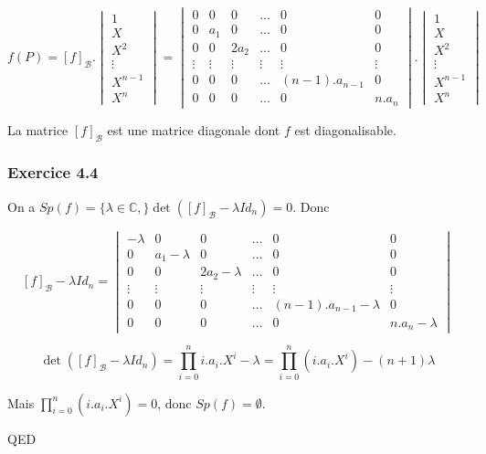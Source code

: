\documentclass[]{book}
\theoremstyle{definition}
\newcommand{\bb}[1]{\mathbb{#1}}
\newcommand{\C}{\bb{C}}
\begin{document}
$$f(P) = [f]_{\mathscr{B}}. \begin{vmatrix} 1 \\ X \\ X^2 \\ \vdots \\ X^{n-1} \\ X^{n} \end{vmatrix} = \begin{vmatrix} 0 & 0 & 0 & \ldots & 0 & 0 \\ 0 & a_1 & 0 & \ldots & 0 & 0 \\ 0 & 0 & 2a_2 & \ldots & 0 & 0 \\ \vdots & \vdots & \vdots & \vdots & \vdots & \vdots \\ 0 & 0 & 0 & \ldots & (n-1).a_{n-1} & 0\\ 0 & 0 & 0 & \ldots & 0 & n.a_n  \end{vmatrix}.\begin{vmatrix} 1 \\ X \\ X^2 \\ \vdots \\ X^{n-1} \\ X^{n} \end{vmatrix}$$

La matrice $[f]_{\mathscr{B}}$ est une matrice diagonale dont $f$ est diagonalisable.

\subsubsection*{Exercice 4.4}
On a $Sp(f) = \{\lambda \in \C, \} \det([f]_{\mathscr{B}} -\lambda Id_n) = 0$. Donc

$$[f]_{\mathscr{B}} -\lambda Id_n = \begin{vmatrix} -\lambda & 0 & 0 & \ldots & 0 & 0 \\ 0 & a_1-\lambda & 0 & \ldots & 0 & 0 \\ 0 & 0 & 2a_2-\lambda & \ldots & 0 & 0 \\ \vdots & \vdots & \vdots & \vdots & \vdots & \vdots \\ 0 & 0 & 0 & \ldots & (n-1).a_{n-1}-\lambda & 0\\ 0 & 0 & 0 & \ldots & 0 & n.a_n-\lambda  \end{vmatrix}$$

$$\det([f]_{\mathscr{B}} -\lambda Id_n) = \prod_{i=0}^{n} i.a_i.X^i-\lambda = \prod_{i=0}^{n}(i.a_i.X^i) -(n+1)\lambda$$ 

Mais $\prod_{i=0}^{n}(i.a_i.X^i) = 0$, donc $Sp(f) = \emptyset$. 

QED
\end{document}
